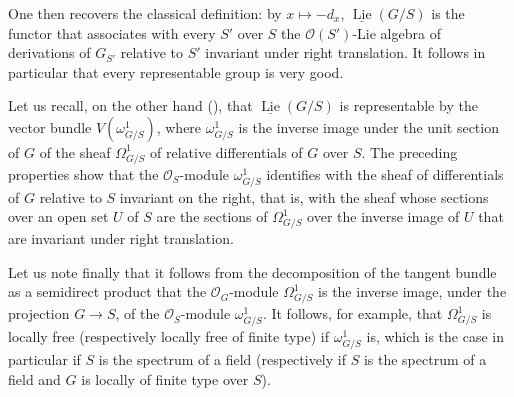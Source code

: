 %
One then recovers the classical definition: by \(x\mapsto-d_x\),
\(\underline{\operatorname{Lie}}(G/S)\) is the functor that associates
with every \(S'\) over \(S\) the \(\mathcal O(S')\)-Lie algebra of
derivations of \(G_{S'}\) relative to \(S'\) invariant under right
translation. It follows in particular that every representable
group is very good.

Let us recall, on the other hand (), that
\(\underline{\operatorname{Lie}}(G/S)\) is representable by the vector
bundle \(V(\omega^1_{G/S})\), where \(\omega^1_{G/S}\) is the inverse image
under the unit section of \(G\) of the sheaf \(\Omega^1_{G/S}\) of relative
differentials of \(G\) over \(S\).
The preceding properties show that the
\(\mathcal O_S\)-module \(\omega^1_{G/S}\) identifies with the sheaf of
differentials of \(G\) relative to \(S\) invariant on the right, that is,
with the sheaf whose sections over an open set \(U\) of \(S\) are the
sections of \(\Omega^1_{G/S}\) over the inverse image of \(U\) that are
invariant under right translation.

%
Let us note finally that it follows from the decomposition of the tangent
bundle as a semidirect product that the \(\mathcal O_G\)-module
\(\Omega^1_{G/S}\) is the inverse image, under the projection
\(G\to S\), of the \(\mathcal O_S\)-module \(\omega^1_{G/S}\). It follows,
for example, that \(\Omega^1_{G/S}\) is locally free (respectively locally
free of finite type) if \(\omega^1_{G/S}\) is, which is the case in
particular if \(S\) is the spectrum of a field (respectively if \(S\) is the
spectrum of a field and \(G\) is locally of finite type over \(S\)).

